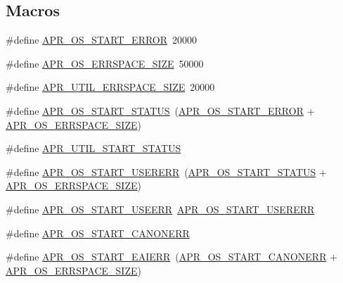 \subsection*{Macros}
\begin{DoxyCompactItemize}
\item 
\#define \hyperlink{group__apr__errno_ga191894048b7bd0cca3cf0bdff1eb695b}{A\+P\+R\+\_\+\+O\+S\+\_\+\+S\+T\+A\+R\+T\+\_\+\+E\+R\+R\+OR}~20000
\item 
\#define \hyperlink{group__apr__errno_gadb8d97e6836ccdc57b43b6119a5acccf}{A\+P\+R\+\_\+\+O\+S\+\_\+\+E\+R\+R\+S\+P\+A\+C\+E\+\_\+\+S\+I\+ZE}~50000
\item 
\#define \hyperlink{group__apr__errno_gaef5e79630739f24d1512d0d044c2bae7}{A\+P\+R\+\_\+\+U\+T\+I\+L\+\_\+\+E\+R\+R\+S\+P\+A\+C\+E\+\_\+\+S\+I\+ZE}~20000
\item 
\#define \hyperlink{group__apr__errno_ga450e1a5734732e092ddaa5b67414f69b}{A\+P\+R\+\_\+\+O\+S\+\_\+\+S\+T\+A\+R\+T\+\_\+\+S\+T\+A\+T\+US}~(\hyperlink{group__apr__errno_ga191894048b7bd0cca3cf0bdff1eb695b}{A\+P\+R\+\_\+\+O\+S\+\_\+\+S\+T\+A\+R\+T\+\_\+\+E\+R\+R\+OR} + \hyperlink{group__apr__errno_gadb8d97e6836ccdc57b43b6119a5acccf}{A\+P\+R\+\_\+\+O\+S\+\_\+\+E\+R\+R\+S\+P\+A\+C\+E\+\_\+\+S\+I\+ZE})
\item 
\#define \hyperlink{group__apr__errno_gadf26297a72afa0ea224e7097fe59a1cd}{A\+P\+R\+\_\+\+U\+T\+I\+L\+\_\+\+S\+T\+A\+R\+T\+\_\+\+S\+T\+A\+T\+US}
\item 
\#define \hyperlink{group__apr__errno_gacd35b2de1e38a1fa4717e38d5e153571}{A\+P\+R\+\_\+\+O\+S\+\_\+\+S\+T\+A\+R\+T\+\_\+\+U\+S\+E\+R\+E\+RR}~(\hyperlink{group__apr__errno_ga450e1a5734732e092ddaa5b67414f69b}{A\+P\+R\+\_\+\+O\+S\+\_\+\+S\+T\+A\+R\+T\+\_\+\+S\+T\+A\+T\+US} + \hyperlink{group__apr__errno_gadb8d97e6836ccdc57b43b6119a5acccf}{A\+P\+R\+\_\+\+O\+S\+\_\+\+E\+R\+R\+S\+P\+A\+C\+E\+\_\+\+S\+I\+ZE})
\item 
\#define \hyperlink{group__apr__errno_ga803b8badf8695bdfa4fbcf4d330371f0}{A\+P\+R\+\_\+\+O\+S\+\_\+\+S\+T\+A\+R\+T\+\_\+\+U\+S\+E\+E\+RR}~\hyperlink{group__apr__errno_gacd35b2de1e38a1fa4717e38d5e153571}{A\+P\+R\+\_\+\+O\+S\+\_\+\+S\+T\+A\+R\+T\+\_\+\+U\+S\+E\+R\+E\+RR}
\item 
\#define \hyperlink{group__apr__errno_ga7bca957c11b80b31cb54b0d2cbe9e025}{A\+P\+R\+\_\+\+O\+S\+\_\+\+S\+T\+A\+R\+T\+\_\+\+C\+A\+N\+O\+N\+E\+RR}
\item 
\#define \hyperlink{group__apr__errno_ga2d04991cb57c67a896e22125a1f22b49}{A\+P\+R\+\_\+\+O\+S\+\_\+\+S\+T\+A\+R\+T\+\_\+\+E\+A\+I\+E\+RR}~(\hyperlink{group__apr__errno_ga7bca957c11b80b31cb54b0d2cbe9e025}{A\+P\+R\+\_\+\+O\+S\+\_\+\+S\+T\+A\+R\+T\+\_\+\+C\+A\+N\+O\+N\+E\+RR} + \hyperlink{group__apr__errno_gadb8d97e6836ccdc57b43b6119a5acccf}{A\+P\+R\+\_\+\+O\+S\+\_\+\+E\+R\+R\+S\+P\+A\+C\+E\+\_\+\+S\+I\+ZE})

\end{DoxyCompactItemize}
